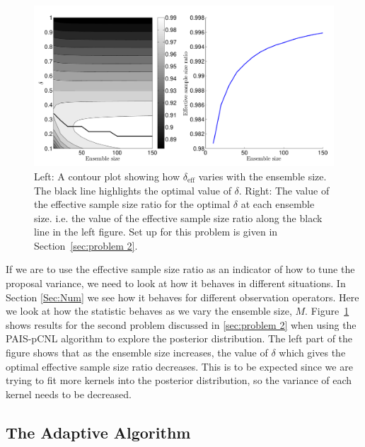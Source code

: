 \documentclass[final]{siamltex}
\begin{document}
\begin{figure}[htpb]
\begin{center}
\includegraphics[width=\textwidth]{figures/neff-M}
\caption{Left: A contour plot showing how $\delta_{\text{eff}}$ varies with the ensemble size. The black line highlights the optimal value of $\delta$. Right: The value of the effective sample size ratio for the optimal $\delta$ at each ensemble size. i.e. the value of the effective sample size ratio along the black line in the left figure. Set up for this problem is given in Section~\ref{sec:problem 2}.}
\label{fig:neff-M}
\end{center}
\end{figure}

If we are to use the effective sample size ratio as an indicator of
how to tune the proposal variance, we need to look at how it behaves
in different situations. In Section \ref{Sec:Num} we see how it behaves for different observation operators. Here we look at how the statistic behaves as we vary the ensemble size, $M$. Figure~\ref{fig:neff-M} shows results for the second problem discussed in \ref{sec:problem 2} when using the PAIS-pCNL algorithm to explore the posterior distribution. The left part of the figure shows that as the ensemble size increases, the value of $\delta$ which gives the optimal effective sample size ratio decreases. This is to be expected since we are trying to fit more kernels into the posterior distribution, so the variance of each kernel needs to be decreased.

\subsection{The Adaptive Algorithm}\label{sec:adapt}
\end{document}
